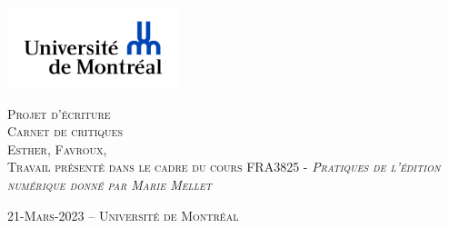 \documentclass[12pt,french,letterpaper]{article}
\subtitle{Carnet de critiques}
\author{Esther    Favroux    Université de Montréal }
\date{}
\begin{document}

\begin{titlepage}%
\begin{center}
    \enlargethispage{2cm}
    
\includegraphics[width = 50mm]{logo} %

\vspace*{3cm}
\scshape\Huge Projet d'écriture\\
\normalfont\Large Carnet de critiques\\
\large \vspace*{3cm}
Esther,  Favroux,  
\\
\normalsize\vspace*{1cm}Travail présenté dans le cadre du cours FRA3825 - \em Pratiques
de l'édition numérique
 \normalfont donné par Marie Mellet 

\vspace*{3cm}
\end{center}

\vspace*{\fill}
\begin{flushright}
\end{flushright}

\begin{center}
\scshape\normalsize\vspace*{1cm} 21-Mars-2023 --      Université de
Montréal 
\\
\end{center}
\end{titlepage}




\newpage 
\end{document}
